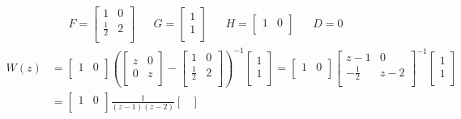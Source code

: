 \begin{example}
\begin{align*}
    F = \begin{bmatrix}
        1 & 0\\
        \frac{1}{2} & 2\\
    \end{bmatrix}
    &&
    G = \begin{bmatrix}
        1\\
        1\\
    \end{bmatrix}
    &&
    H = \begin{bmatrix}
        1 & 0\\
    \end{bmatrix}
    &&
    D = 0
\end{align*}
\begin{align*}
W(z) &=
\begin{bmatrix}
    1 & 0\\
\end{bmatrix}
\left( \begin{bmatrix}
    z & 0\\
    0 & z\\
\end{bmatrix}
-
\begin{bmatrix}
    1 & 0 \\
    \frac{1}{2} & 2\\
\end{bmatrix}\right)^{-1}
\begin{bmatrix}
    1\\
    1\\
\end{bmatrix}
= \begin{bmatrix}
    1 & 0\\
\end{bmatrix}
\begin{bmatrix}
    z-1 & 0\\
    -\frac{1}{2} & z-2\\
\end{bmatrix}^{-1}
\begin{bmatrix}
    1\\
    1\\
\end{bmatrix}\\
&= \begin{bmatrix}
    1 & 0\\
\end{bmatrix}
\frac{1}{(z-1)(z-2)}
\begin{bmatrix}

\end{bmatrix}
\end{align*}
\end{example}
